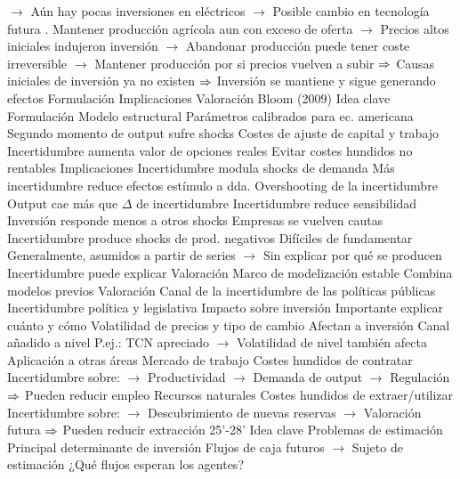 \documentclass{nuevotema}
\begin{document}
\begin{esquemal}
				\4[] $\to$ Aún hay pocas inversiones en eléctricos
				\4[] $\to$ Posible cambio en tecnología futura
				. Mantener producción agrícola aun con exceso de oferta
				\4[] $\to$ Precios altos iniciales indujeron inversión
				\4[] $\to$ Abandonar producción puede tener coste irreversible
				\4[] $\to$ Mantener producción por si precios vuelven a subir
				\4[] $\Rightarrow$ Causas iniciales de inversión ya no existen
				\4[] $\Rightarrow$ Inversión se mantiene y sigue generando efectos
			\3 Formulación
			\3 Implicaciones
			\3 Valoración
		\2 Bloom (2009)
			\3 Idea clave
			\3 Formulación
				\4 Modelo estructural
				\4 Parámetros calibrados para ec. americana
				\4 Segundo momento de output sufre shocks
				\4 Costes de ajuste de capital y trabajo
				\4 Incertidumbre aumenta valor de opciones reales
				\4[] Evitar costes hundidos no rentables
			\3 Implicaciones
				\4 Incertidumbre modula shocks de demanda
				\4[] Más incertidumbre reduce efectos estímulo a dda.
				\4 Overshooting de la incertidumbre
				\4[] Output cae más que $\Delta$ de incertidumbre
				\4 Incertidumbre reduce sensibilidad
				\4[] Inversión responde menos a otros shocks
				\4[] Empresas se vuelven cautas
				\4 Incertidumbre produce shocks de prod. negativos
				\4[] Difíciles de fundamentar
				\4[] Generalmente, asumidos a partir de series
				\4[] $\to$ Sin explicar por qué se producen
				\4[] Incertidumbre puede explicar
			\3 Valoración
				\4 Marco de modelización estable
				\4 Combina modelos previos
		\2 Valoración
			\3 Canal de la incertidumbre de las políticas públicas
				\4 Incertidumbre política y legislativa
				\4[] Impacto sobre inversión
				\4[] Importante explicar cuánto y cómo
			\3 Volatilidad de precios y tipo de cambio
				\4 Afectan a inversión
				\4 Canal añadido a nivel
				\4[] P.ej.: TCN apreciado
				\4[] $\to$ Volatilidad de nivel también afecta
			\3 Aplicación a otras áreas
				\4 Mercado de trabajo
				\4[] Costes hundidos de contratar
				\4[] Incertidumbre sobre:
				\4[] $\to$ Productividad
				\4[] $\to$ Demanda de output
				\4[] $\to$ Regulación
				\4[] $\Rightarrow$ Pueden reducir empleo
				\4 Recursos naturales
				\4[] Costes hundidos de extraer/utilizar
				\4[] Incertidumbre sobre:
				\4[] $\to$ Descubrimiento de nuevas reservas
				\4[] $\to$ Valoración futura
				\4[] $\Rightarrow$ Pueden reducir extracción
	\1  25'-28'
		\2 Idea clave
			\3 Problemas de estimación
				\4 Principal determinante de inversión
				\4[] Flujos de caja futuros
				\4[] $\to$ Sujeto de estimación
				\4 ¿Qué flujos esperan los agentes?

\end{esquemal}
\end{document}
